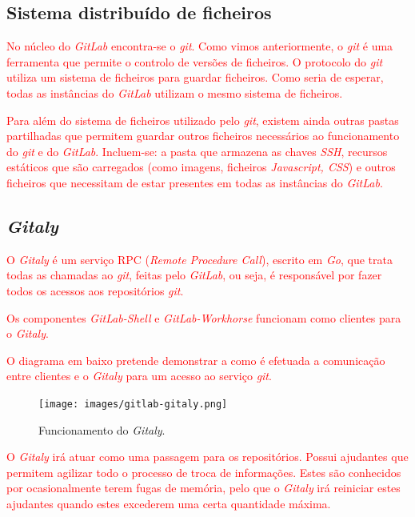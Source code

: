 \documentclass[12pt,a4paper]{article}
\begin{document}
\subsection{Sistema distribuído de ficheiros}
\textcolor{red}{No núcleo do \emph{GitLab} encontra-se o \emph{git}. Como vimos anteriormente, o \emph{git} é uma ferramenta que permite o controlo de versões de ficheiros. O protocolo do \emph{git} utiliza um sistema de ficheiros para guardar ficheiros. Como seria de esperar, todas as instâncias do \emph{GitLab} utilizam o mesmo sistema de ficheiros.}


\textcolor{red}{Para além do sistema de ficheiros utilizado pelo \emph{git}, existem ainda outras pastas partilhadas que permitem guardar outros ficheiros necessários ao funcionamento do \emph{git} e do \emph{GitLab}. Incluem-se: a pasta que armazena as chaves \emph{SSH}, recursos estáticos que são carregados (como imagens, ficheiros \emph{Javascript, CSS}) e outros ficheiros que necessitam de estar presentes em todas as instâncias do \emph{GitLab}.}


\subsection{\emph{Gitaly}}

\textcolor{red}{O \emph{Gitaly} é um serviço RPC (\emph{Remote Procedure Call}), escrito em \textit{Go}, que trata todas as chamadas ao \emph{git}, feitas pelo \emph{GitLab}, ou seja, é responsável por fazer todos os acessos aos repositórios \emph{git}.}

\textcolor{red}{Os componentes \emph{GitLab-Shell} e \emph{GitLab-Workhorse} funcionam como clientes para o \emph{Gitaly}.}

\textcolor{red}{O diagrama em baixo pretende demonstrar a como é efetuada a comunicação entre clientes e o \emph{Gitaly} para um acesso ao serviço \emph{git}.}

\begin{figure}[H]
  \centering
  \texttt{[image: images/gitlab-gitaly.png]}
  \caption{Funcionamento do \emph{Gitaly}.}
\end{figure}

\textcolor{red}{O \textit{Gitaly} irá atuar como uma passagem para os repositórios. Possui ajudantes que permitem agilizar todo o processo de troca de informações. Estes são conhecidos por ocasionalmente terem fugas de memória, pelo que o \textit{Gitaly} irá reiniciar estes ajudantes quando estes excederem uma certa quantidade máxima.}
\end{document}
